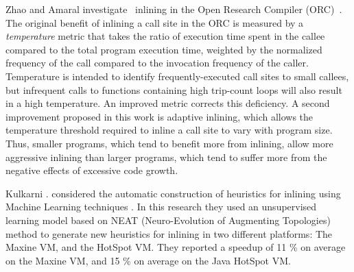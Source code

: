Zhao and Amaral investigate \FDO\ inlining in the Open Research
Compiler (ORC)~\cite{Zhao03}.  The original benefit of inlining a
call site in the ORC is measured by a {\it temperature} metric that
takes the ratio of execution time spent in the callee compared to the
total program execution time, weighted by the normalized frequency of
the call compared to the invocation frequency of the caller.
Temperature is intended to identify frequently-executed call sites to
small callees, but infrequent calls to functions containing high
trip-count loops will also result in a high temperature.  An improved
metric corrects this deficiency.  A second improvement proposed in
this work is adaptive inlining, which allows the temperature threshold
required to inline a call site to vary with program size.  Thus,
smaller programs, which tend to benefit more from inlining, allow more
aggressive inlining than larger programs, which tend to suffer more
from the negative effects of excessive code growth.

Kulkarni \etal. considered the automatic construction of heuristics for
inlining using Machine Learning techniques \cite{KulkarniCGO13}. In this
research they used an unsupervised learning model based on NEAT
(Neuro-Evolution of Augmenting Topologies) method to generate new heuristics
for inlining in two different platforms: The Maxine VM, and the HotSpot VM.
They reported a speedup of 11 \% on average on the Maxine VM, and 15 \% on
average on the Java HotSpot VM.
